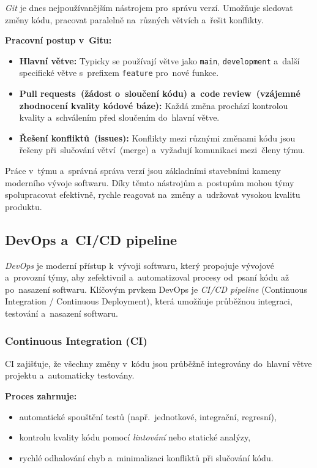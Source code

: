 \documentclass[male,czech,api_bc]{kitheses}
\begin{document}
\textit{Git} je dnes nejpoužívanějším nástrojem pro~správu verzí. Umožňuje sledovat změny kódu, pracovat paralelně na~různých větvích a~řešit konflikty.\cite{git}

\textbf{Pracovní postup v~Gitu:}
\begin{itemize}
	\item \textbf{Hlavní větve:} Typicky se používají větve jako \texttt{main}, \texttt{development} a~další specifické větve s~prefixem \texttt{feature} pro~nové funkce.
	\item \textbf{Pull requests~(žádost o~sloučení kódu) a~code review~(vzájemné zhodnocení kvality kódové báze):} Každá změna prochází kontrolou kvality a~schválením před sloučením do~hlavní větve.
	\item \textbf{Řešení konfliktů~(issues):} Konflikty mezi různými změnami kódu jsou řešeny při~slučování větví~(merge) a~vyžadují komunikaci mezi~členy týmu.
\end{itemize}

Práce v~týmu a~správná správa verzí jsou základními stavebními kameny moderního vývoje softwaru. Díky těmto nástrojům a~postupům mohou týmy spolupracovat efektivně, rychle reagovat na~změny a~udržovat vysokou kvalitu produktu.

\subsection{DevOps a~CI/CD pipeline}

\textit{DevOps} je moderní přístup k~vývoji softwaru, který propojuje vývojové a~provozní týmy, aby zefektivnil a~automatizoval procesy od~psaní kódu až po~nasazení softwaru. Klíčovým prvkem DevOps je \textit{CI/CD pipeline} (Continuous Integration / Continuous Deployment), která umožňuje průběžnou integraci, testování a~nasazení softwaru.\cite{cicd}

\newpage

\subsubsection{Continuous Integration (CI)}

CI zajišťuje, že všechny změny v~kódu jsou průběžně integrovány do~hlavní větve projektu a~automaticky testovány.

\textbf{Proces zahrnuje:}
\begin{itemize}
	\item automatické spouštění testů (např.~jednotkové, integrační, regresní),
	\item kontrolu kvality kódu pomocí \textit{lintování} nebo statické analýzy,
	\item rychlé odhalování chyb a~minimalizaci konfliktů při slučování kódu.
\end{itemize}
\end{document}
